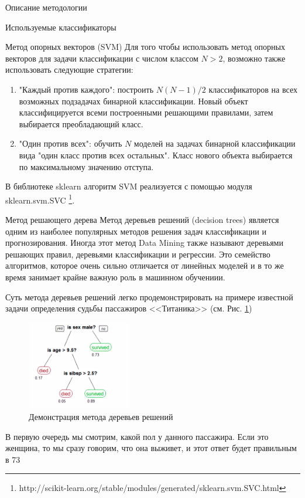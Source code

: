 \begin{section}{Описание методологии}
\begin{subsection}{Используемые классификаторы}
\begin{subsubsection}{Метод опорных векторов (SVM)}
Для того чтобы использовать метод опорных векторов для задачи классификации с числом классом $N > 2$, возможно также использовать следующие стратегии:
\begin{enumerate}
  \item "Каждый против каждого": построить $N(N-1)/2$ классификаторов на всех возможных подзадачах бинарной классификации. Новый объект классифицируется всеми построенными решающими правилами, затем выбирается преобладающий класс.
  \item "Один против всех": обучить $N$ моделей на задачах бинарной классификации вида "один класс против всех остальных". Класс нового объекта выбирается по максимальному значению отступа.
\end{enumerate}

В библиотеке sklearn алгоритм SVM реализуется с помощью модуля sklearn.svm.SVC \footnote{http://scikit-learn.org/stable/modules/generated/sklearn.svm.SVC.html}.
    \end{subsubsection}

    \begin{subsubsection}{Метод решающего дерева}
Метод деревьев решений (decision trees) является одним из наиболее популярных методов решения задач классификации и прогнозирования. Иногда этот метод Data Mining также называют деревьями решающих правил, деревьями классификации и регрессии. Это семейство алгоритмов, которое очень сильно отличается от линейных моделей и в то же время занимает крайне важную роль в машинном обучениии.

Суть метода деревьев решений легко продемонстрировать на примере известной задачи определения судьбы пассажиров <<Титаника>> (см. Рис. \ref{pic:dt1})

\begin{figure}[ht!]
\centering
\includegraphics[width=0.4\textwidth]{pics/dt1}
\caption{Демонстрация метода деревьев решений}
\label{pic:dt1}
\end{figure}

 В первую очередь мы смотрим, какой пол у данного пассажира. Если это женщина, то мы сразу говорим, что она выживет, и этот ответ будет правильным в 73 %


\end{subsubsection}
\end{subsection}
\end{section}

